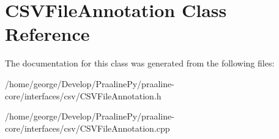 \hypertarget{class_c_s_v_file_annotation}{}\section{C\+S\+V\+File\+Annotation Class Reference}
\label{class_c_s_v_file_annotation}


The documentation for this class was generated from the following files\+:\begin{DoxyCompactItemize}
\item 
/home/george/\+Develop/\+Praaline\+Py/praaline-\/core/interfaces/csv/C\+S\+V\+File\+Annotation.\+h\item 
/home/george/\+Develop/\+Praaline\+Py/praaline-\/core/interfaces/csv/C\+S\+V\+File\+Annotation.\+cpp\end{DoxyCompactItemize}
